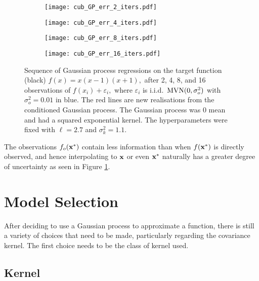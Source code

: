 \begin{figure}[htbp]
    \centering
    \begin{subfigure}[b]{0.5\textwidth}
        \centering
        \texttt{[image: cub\_GP\_err\_2\_iters.pdf]}
    \end{subfigure}%
    \hfill%
    \begin{subfigure}[b]{0.5\textwidth}
        \centering
        \texttt{[image: cub\_GP\_err\_4\_iters.pdf]}
    \end{subfigure}
    \begin{subfigure}[b]{0.5\textwidth}
        \centering
        \texttt{[image: cub\_GP\_err\_8\_iters.pdf]}
    \end{subfigure}%
    \hfill%
    \begin{subfigure}[b]{0.5\textwidth}
        \centering
        \texttt{[image: cub\_GP\_err\_16\_iters.pdf]}
    \end{subfigure}%
    \caption[{
        Gaussian process regression with noise
    }]{
        Sequence of Gaussian process regressions on the target function
        (black) $f(x) = x(x-1)(x+1),$ after 2, 4, 8, and 16 observations of
        $f(x_i) + \varepsilon_i,$ where $\varepsilon_i$ is i.i.d.\
        $\operatorname{MVN}(0, \sigma^2_o)$ with $\sigma^2_o = 0.01$
        in blue. The red lines are new realisations from the conditioned
        Gaussian process. The Gaussian process was 0 mean and had a squared
        exponential kernel. The hyperparameters were fixed with $\ell = 2.7$
        and $\sigma^2_k = 1.1.$
    }
    \label{fig:var_cub_reg}
\end{figure}

The observations $f_o(\mathbf{x}^\ast)$ contain less information than when $f(\mathbf{x}^\ast)$
is directly observed, and hence interpolating to $\mathbf{x}$ or even $\mathbf{x}^\ast$
naturally has a
greater degree of uncertainty as seen in Figure \ref{fig:var_cub_reg}.

\section{Model Selection}

After deciding to use a Gaussian process to approximate a function, there is
still a variety of choices that need to be made, particularly
regarding the covariance kernel. The first
choice needs to be the class of kernel used.

\subsection*{Kernel}

